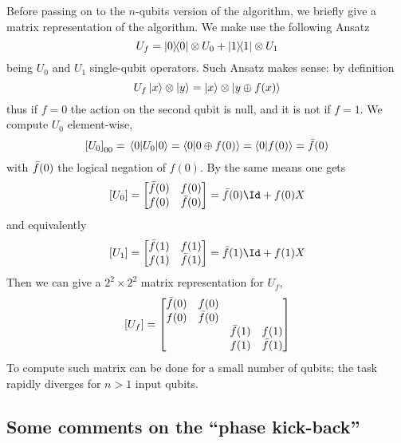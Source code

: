 Before passing on to the $n$-qubits version of the algorithm, we briefly give a matrix representation of the algorithm. We make use the following Ansatz
\[
    U_f = \op{0} \otimes U_0 + \op{1} \otimes U_1
\]
being $U_0$ and $U_1$ single-qubit operators. Such Ansatz makes sense: by definition
\[
    U_f \ket{x} \otimes \ket{y} = \ket{x} \otimes \ket{y \oplus f(x)}
\]
thus if $f=0$ the action on the second qubit is null, and it is not if $f=1$. We compute $U_0$ element-wise,
\[
    \left[{U_0}\right]_{00} = \mel{0}{U_0}{0} = \braket{0}{0 \oplus f(0)} = \braket{0}{f(0)} = \Bar{f}(0)
\]
with $\Bar{f}(0)$ the logical negation of $f(0)$. By the same means one gets
\[
    \lrS{U_0} = \begin{bmatrix}
        \Bar{f}(0) & f(0) \\
        f(0) & \Bar{f}(0)
    \end{bmatrix} = \Bar{f}(0) \Id + f(0) X
\]
and equivalently
\[
    \lrS{U_1} = \begin{bmatrix}
        \Bar{f}(1) & f(1) \\
        f(1) & \Bar{f}(1)
    \end{bmatrix} = \Bar{f}(1) \Id + f(1) X
\]
Then we can give a $2^2 \times 2^2$ matrix representation for $U_f$,
\[
    \left[{U_f}\right] = \begin{bmatrix}
        \Bar{f}(0) & f(0) & & \\
        f(0) & \Bar{f}(0) & & \\
        & & \Bar{f}(1) & f(1) \\
        & & f(1) & \Bar{f}(1)
    \end{bmatrix}
\]
To compute such matrix can be done for a small number of qubits; the task rapidly diverges for $n>1$ input qubits.

\subsection{Some comments on the ``phase kick-back''}\label{subsec:some comments on the ``phase kick-back''}

